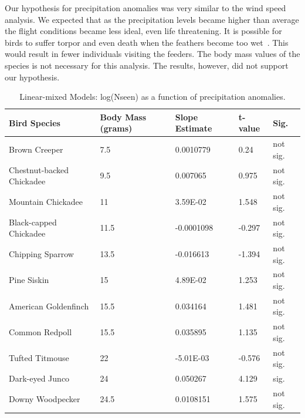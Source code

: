 Our hypothesis for precipitation anomalies was very similar to the wind speed analysis. We expected that as the precipitation levels became higher than average the flight conditions became less ideal, even life threatening. It is possible for birds to suffer torpor and even death when the feathers become too wet~\cite{kennedy1970direct}. This would result in fewer individuals visiting the feeders. The body mass values of the species is not necessary for this analysis. The results, however, did not support our hypothesis.

\begin{longtable}[c]{|l|l|l|l|l|}
\caption{Linear-mixed Models: log(Nseen) as a function of precipitation anomalies.}
\label{my-label}\\
\hline
Bird Species              & Body Mass (grams) & Slope Estimate & t-value  & Sig.     \\ \hline
\endhead
%
Brown Creeper             & 7.5               & 0.0010779      & 0.24     & not sig. \\ \hline
Chestnut-backed Chickadee & 9.5               & 0.007065       & 0.975    & not sig. \\ \hline
Mountain Chickadee        & 11                & 3.59E-02       & 1.548    & not sig. \\ \hline
Black-capped Chickadee    & 11.5              & -0.0001098     & -0.297   & not sig. \\ \hline
Chipping Sparrow          & 13.5              & -0.016613      & -1.394   & not sig. \\ \hline
Pine Siskin               & 15                & 4.89E-02       & 1.253    & not sig. \\ \hline
American Goldenfinch      & 15.5              & 0.034164       & 1.481    & not sig. \\ \hline
Common Redpoll            & 15.5              & 0.035895       & 1.135    & not sig. \\ \hline
Tufted Titmouse           & 22                & -5.01E-03      & -0.576   & not sig. \\ \hline
Dark-eyed Junco           & 24                & 0.050267       & 4.129    & sig.     \\ \hline
Downy Woodpecker          & 24.5              & 0.0108151      & 1.575    & not sig. \\ \hline

\end{longtable}
